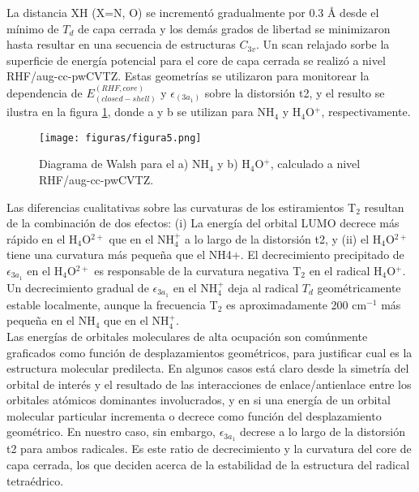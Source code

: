 \documentclass[12pt]{report}
\begin{document}
La distancia XH (X=N, O) se incrementó gradualmente por 0.3 \AA$ $ desde el mínimo de $T_d$ de capa cerrada y los demás grados de libertad se minimizaron hasta resultar en una secuencia de estructuras $C_{3v}$. Un scan relajado sorbe la superficie de energía potencial para el core de capa cerrada se realizó a nivel RHF/aug-cc-pwCVTZ. Estas geometrías se utilizaron para monitorear la dependencia de $E_{(closed-shell)}^{(RHF, core)}$ y $\epsilon_{(3a_1)}$ sobre la distorsión t2, y el resulto se ilustra en la figura \ref{walsh}, donde a y b se utilizan para NH$_4$ y H$_4$O$^+$, respectivamente.

\begin{figure}[h!]
\centering
\texttt{[image: figuras/figura5.png]} 
\caption{Diagrama de Walsh para el a) NH$_4$ y b) H$_4$O$^+$, calculado a nivel RHF/aug-cc-pwCVTZ.}
\label{walsh}
\end{figure}


\newpage
Las diferencias cualitativas sobre las curvaturas de los estiramientos T$_2$ resultan de la combinación de dos efectos: (i) La energía del orbital LUMO decrece más rápido en el H$_4$O$^{2+}$ que en el NH$_4^+$ a lo largo de la distorsión t2, y (ii) el H$_4$O$^{2+}$ tiene una curvatura más pequeña que el NH4+. El decrecimiento precipitado de $\epsilon_{3a_1}$ en el H$_4$O$^{2+}$ es responsable de la curvatura negativa T$_2$ en el radical H$_4$O$^+$. Un decrecimiento gradual de $\epsilon_{3a_1}$ en el NH$_4^+$ deja al radical $T_d$ geométricamente estable localmente, aunque la frecuencia T$_2$ es aproximadamente 200 cm$^{-1}$ más pequeña en el NH$_4$ que en el NH$_4^+$.
\\


Las energías de orbitales moleculares de alta ocupación son comúnmente graficados como función de desplazamientos geométricos, para justificar cual es la estructura molecular predilecta. En algunos casos está claro desde la simetría del orbital de interés y el resultado de las interacciones de enlace/antienlace entre los orbitales atómicos dominantes involucrados, y en si una energía de un orbital molecular particular incrementa o decrece como función del desplazamiento geométrico. En nuestro caso, sin embargo, $\epsilon_{3a_1}$ decrese a lo largo de la distorsión t2 para ambos radicales. Es este ratio de decrecimiento y la curvatura del core de capa cerrada, los que deciden acerca de la estabilidad de la estructura del radical tetraédrico.
\\
\end{document}
